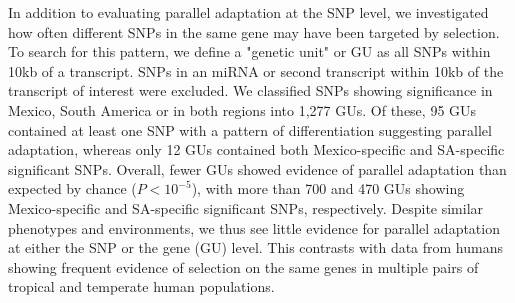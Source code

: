 {{{%
%
In addition to evaluating parallel adaptation at the SNP level, we investigated how often different SNPs in the same gene may have been targeted by selection. To search for this pattern, we define a "genetic unit" or GU as all SNPs within 10kb of a transcript.  SNPs in an miRNA or second transcript within 10kb of the transcript of interest were excluded.  
We classified SNPs showing significance in Mexico, South America or in both regions into 1,277 GUs. 
Of these, 95 GUs contained at least one SNP with a pattern of differentiation suggesting parallel adaptation, whereas only 12 GUs contained both Mexico-specific and SA-specific significant SNPs. 
Overall, fewer GUs showed evidence of parallel adaptation than expected by chance ($P<10^{-5}$), with more than 700 and 470 GUs showing Mexico-specific and SA-specific significant SNPs, respectively.  
Despite similar phenotypes and environments, we thus see little evidence for parallel adaptation at either the SNP or the gene (GU) level.  
This contrasts with data from humans \citep{Tennessen_2011_21698142} showing frequent evidence of selection on the same genes in multiple pairs of tropical and temperate human populations.  



}}}
